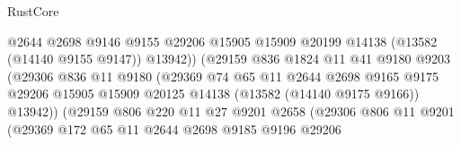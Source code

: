 \begin{lexlean}{RustCore}
\begin{coremodule}
                                      @2644
                                      @2698
                                      @9146
                                      @9155
                                      @29206
                                      @15905
                                      @15909
                                      @20199
                                      @14138
                                      (@13582 (@14140 @9155 @9147))
                                      @13942))
                                  (@29159
                                    @836
                                    @1824
                                    @11
                                    @41
                                    @9180
                                    @9203
                                    (@29306
                                      @836
                                      @11
                                      @9180
                                      (@29369
                                        @74
                                        @65
                                        @11
                                        @2644
                                        @2698
                                        @9165
                                        @9175
                                        @29206
                                        @15905
                                        @15909
                                        @20125
                                        @14138
                                        (@13582 (@14140 @9175 @9166))
                                        @13942))
                                    (@29159
                                      @806
                                      @220
                                      @11
                                      @27
                                      @9201
                                      @2658
                                      (@29306
                                        @806
                                        @11
                                        @9201
                                        (@29369
                                          @172
                                          @65
                                          @11
                                          @2644
                                          @2698
                                          @9185
                                          @9196
                                          @29206

\end{coremodule}
\end{lexlean}
